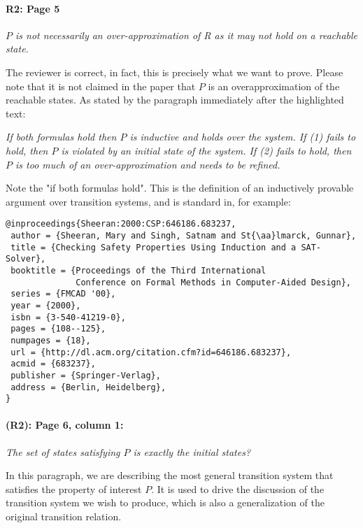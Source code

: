 \documentclass{article}
\begin{document}
\paragraph{R2: Page 5} \textit{$P$ is not necessarily an
over-approximation of R as it may not hold on a reachable state.}
\vspace{0.05in}


\noindent The reviewer is correct, in fact, this is precisely what we want to prove.
Please note that it is not claimed in the paper that $P$ is an overapproximation of the reachable states. As stated by the paragraph immediately after the highlighted text:

\textit{If both formulas hold then $P$ is inductive and holds over the
system. If (1) fails to hold, then $P$ is violated by an initial
state of the system. If (2) fails to hold, then $P$ is too much of an
over-approximation and needs to be refined.}

Note the "if both formulas hold". This is the definition of an
inductively provable argument over transition systems, and is
standard in, for example:

\begin{small}
\begin{verbatim}
@inproceedings{Sheeran:2000:CSP:646186.683237,
 author = {Sheeran, Mary and Singh, Satnam and St{\aa}lmarck, Gunnar},
 title = {Checking Safety Properties Using Induction and a SAT-Solver},
 booktitle = {Proceedings of the Third International 
              Conference on Formal Methods in Computer-Aided Design},
 series = {FMCAD '00},
 year = {2000},
 isbn = {3-540-41219-0},
 pages = {108--125},
 numpages = {18},
 url = {http://dl.acm.org/citation.cfm?id=646186.683237},
 acmid = {683237},
 publisher = {Springer-Verlag},
 address = {Berlin, Heidelberg},
}
\end{verbatim}
\end{small}

\paragraph{(R2): Page 6, column 1:} \textit{The set of states satisfying $P$ is exactly the initial states?}

\noindent In this paragraph, we are describing the most general transition system that satisfies the property of interest $P$.  It is used to drive the discussion of the transition system we wish to produce, which is also a generalization of the original transition relation.
\end{document}
